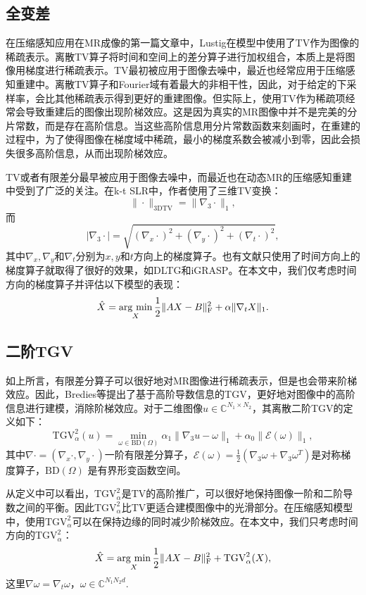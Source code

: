 \subsection{全变差}
在压缩感知应用在MR成像的第一篇文章中，Lustig\cite{Lustig2008Compressed}在模型中使用了TV作为图像的稀疏表示。离散TV算子将时间和空间上的差分算子进行加权组合，本质上是将图像用梯度进行稀疏表示。TV最初被应用于图像去噪中\cite{rof}，最近也经常应用于压缩感知重建中。离散TV算子和Fourier域有着最大的非相干性，因此，对于给定的下采样率，会比其他稀疏表示得到更好的重建图像。但实际上，使用TV作为稀疏项经常会导致重建后的图像出现阶梯效应。这是因为真实的MR图像中并不是完美的分片常数，而是存在高阶信息。当这些高阶信息用分片常数函数来刻画时，在重建的过程中，为了使得图像在梯度域中稀疏，最小的梯度系数会被减小到零，因此会损失很多高阶信息，从而出现阶梯效应。

TV或者有限差分最早被应用于图像去噪中，而最近也在动态MR的压缩感知重建中受到了广泛的关注。在k-t SLR\cite{Sajan2011Accelerated}中，作者使用了三维TV变换：
$$\|\cdot\|_\mathrm{3DTV} = \|\nabla_3\cdot\|_1,$$
而
$$|\nabla_3\cdot|=\sqrt{(\nabla_x \cdot)^2 + (\nabla_y \cdot)^2 + (\nabla_t \cdot)^2},$$
其中$\nabla_x,\nabla_y$和$\nabla_t$分别为$x,y$和$t$方向上的梯度算子。也有文献只使用了时间方向上的梯度算子就取得了很好的效果，如DLTG\cite{caballero2014dictionary}和iGRASP\cite{igrasp}。在本文中，我们仅考虑时间方向的梯度算子并评估以下模型的表现：
\begin{equation}
\hat{X} = \argmin_X \frac{1}{2}\|AX-B\|_\mathrm{F}^2 + \alpha\|\nabla_t X\|_1.
\end{equation}

\subsection{二阶TGV}
如上所言，有限差分算子可以很好地对MR图像进行稀疏表示，但是也会带来阶梯效应。因此，Bredies\cite{bredies2010total}等提出了基于高阶导数信息的TGV，更好地对图像中的高阶信息进行建模，消除阶梯效应。对于二维图像$u\in \mathbb{C}^{N_1\times N_2}$，其离散二阶TGV的定义如下：
$$\mathrm{TGV}_\alpha^2(u)=\min_{\omega\in \mathrm{BD}(\Omega)}\alpha_1\|\nabla_3 u-\omega\|_1 + \alpha_0\|\mathcal{E}(\omega)\|_1,$$
其中$\nabla\cdot=(\nabla_x\cdot, \nabla_y\cdot)$一阶有限差分算子，$\mathcal{E}(\omega)=\frac{1}{2}(\nabla_3\omega+\nabla_3\omega^{T})$是对称梯度算子，$\mathrm{BD}(\Omega)$ 是有界形变函数空间。

从定义中可以看出，$\mathrm{TGV}_\alpha^2$是TV的高阶推广，可以很好地保持图像一阶和二阶导数之间的平衡。因此$\mathrm{TGV}_\alpha^2$比TV更适合建模图像中的光滑部分。在压缩感知模型中，使用$\mathrm{TGV}_\alpha^2$可以在保持边缘的同时减少阶梯效应。在本文中，我们只考虑时间方向的$\mathrm{TGV}_\alpha^2$：
\begin{equation}
\hat{X} = \argmin_X \frac{1}{2}\|AX-B\|_\mathrm{F}^2+\mathrm{TGV}_\alpha^2(X),
\end{equation}
这里$\nabla \omega = \nabla_t \omega$，$\omega\in \mathbb{C}^{N_1N_2d}$.

